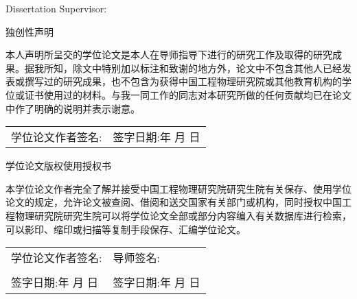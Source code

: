 \vspace{50pt}

\begin{center}
  Dissertation Supervisor: \quad  \supervisortitleen \, \thesupervisoren
\end{center}

\vspace{20pt}

\begin{center}
  \textbf{\thethesismonthen}
\end{center}

\clearpage
\vspace{20pt}
\begin{center}
  独创性声明
\end{center}
\vspace{40pt}
\par 本人声明所呈交的学位论文是本人在导师指导下进行的研究工作及取得的研究成果。据我所知，除文中特别加以标注和致谢的地方外，论文中不包含其他人已经发表或撰写过的研究成果，也不包含为获得中国工程物理研究院或其他教育机构的学位或证书使用过的材料。与我一同工作的同志对本研究所做的任何贡献均已在论文中作了明确的说明并表示谢意。

\vspace{30pt}

\noindent \begin{tabular}{@{}p{}p{}}
  学位论文作者签名: & 签字日期:\qquad \quad 年 \quad 月 \quad 日
\end{tabular}

\vspace{80pt}
\begin{center}
  学位论文版权使用授权书
\end{center}

\vspace{30pt}
\par 本学位论文作者完全了解并接受中国工程物理研究院研究生院有关保存、使用学位论文的规定，允许论文被查阅、借阅和送交国家有关部门或机构，同时授权中国工程物理研究院研究生院可以将学位论文全部或部分内容编入有关数据库进行检索，可以影印、缩印或扫描等复制手段保存、汇编学位论文。

\vspace{40pt}
\begin{flushleft}
\begin{tabular}{@{}p{}p{}}
学位论文作者签名:                          & 导师签名:                                  \\
  \\
签字日期:\qquad \quad 年 \quad 月 \quad 日 & 签字日期:\qquad \quad 年 \quad 月 \quad 日
\end{tabular}
\end{flushleft}


\clearpage

\pagestyle{fancy}